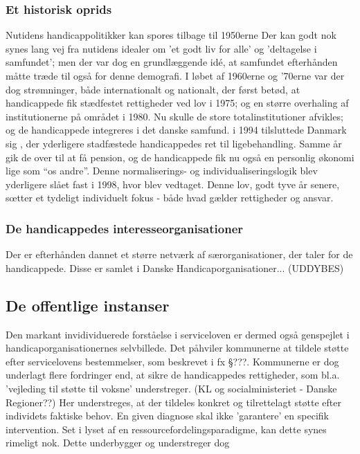 \subsubsection{Et historisk oprids}
Nutidens handicappolitikker kan spores tilbage til 1950erne
Der kan godt nok synes lang vej fra nutidens idealer om 'et godt liv for alle' og 'deltagelse i samfundet'; men der var dog en grundlæggende idé, at samfundet efterhånden måtte træde til også for denne demografi.
I løbet af 1960erne og '70erne var der dog strømninger, både internationalt og nationalt, der først betød, at handicappede fik stædfestet rettigheder ved lov i 1975; og en større overhaling af institutionerne på området i 1980.
Nu skulle de store totalinstitutioner afvikles; og de handicappede integreres i det danske samfund. 
i 1994 tilsluttede Danmark sig , der yderligere stadfæstede handicappedes ret til ligebehandling. Samme år gik de over til at få pension, og de handicappede fik nu også en personlig økonomi lige som “os andre”.
Denne normaliserings- og individualiseringslogik blev yderligere slået fast i 1998, hvor  blev vedtaget.
Denne lov, godt tyve år senere, sœtter et tydeligt individuelt fokus - både hvad gælder rettigheder og ansvar.

\subsubsection{De handicappedes interesseorganisationer}
Der er efterhånden dannet et større netværk af særorganisationer, der taler for de handicappede.
Disse er samlet i Danske Handicaporganisationer... (UDDYBES)

\subsection{De offentlige instanser}
Den markant invidividuerede forståelse i serviceloven er dermed også genspejlet i handicaporganisationernes selvbillede.
Det påhviler kommunerne at tildele støtte efter servicelovens bestemmelser, som beskrevet i fx §???.
Kommunerne er dog underlagt flere fordringer end, at sikre de handicappedes rettigheder, som bl.a. 'vejleding til støtte til voksne' understreger. (KL og socialministeriet - Danske Regioner??)
Her understreges, at der tildeles konkret og tilrettelagt støtte efter individets faktiske behov.
En given diagnose skal ikke 'garantere' en specifik intervention.
Set i lyset af en ressourcefordelingsparadigme, kan dette synes rimeligt nok. Dette underbygger og understreger dog 

